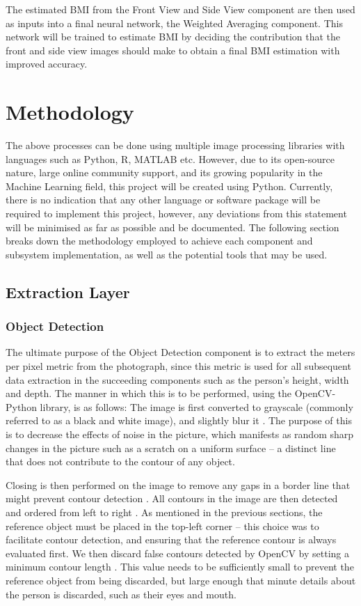 \documentclass[conference]{IEEEtran}
\begin{document}
The estimated BMI from the Front View and Side View component are then used as inputs into a final neural network, the Weighted Averaging component.
This network will be trained to estimate BMI by deciding the contribution that the front and side view images should make to obtain a final BMI estimation with improved accuracy.
\section{Methodology}
The above processes can be done using multiple image processing libraries with languages such as Python, R, MATLAB etc.
However, due to its open-source nature, large online community support, and its growing popularity in the Machine Learning field, this project will be created using Python.
Currently, there is no indication that any other language or software package will be required to implement this project, however, any deviations from this statement will be minimised as far as possible and be documented.
The following section breaks down the methodology employed to achieve each component and subsystem implementation, as well as the potential tools that may be used.
\subsection{Extraction Layer}
\subsubsection{Object Detection}
The ultimate purpose of the Object Detection component is to extract the meters per pixel metric from the photograph, since this metric is used for all subsequent data extraction in the succeeding components such as the person's height, width and depth.
The manner in which this is to be performed, using the OpenCV-Python library, is as follows: The image is first converted to grayscale (commonly referred to as a black and white image), and slightly blur it \cite{objectDetection}.
The purpose of this is to decrease the effects of noise in the picture, which manifests as random sharp changes in the picture such as a scratch on a uniform surface -- a distinct line that does not contribute to the contour of any object.

Closing is then performed on the image to remove any gaps in a border line that might prevent contour detection \cite{objectDetection}.
All contours in the image are then detected and ordered from left to right \cite{objectDetection}.
As mentioned in the previous sections, the reference object must be placed in the top-left corner -- this choice was to facilitate contour detection, and ensuring that the reference contour is always evaluated first.
We then discard false contours detected by OpenCV by setting a minimum contour length \cite{objectDetection}.
This value needs to be sufficiently small to prevent the reference object from being discarded, but large enough that minute details about the person is discarded, such as their eyes and mouth.
\end{document}
